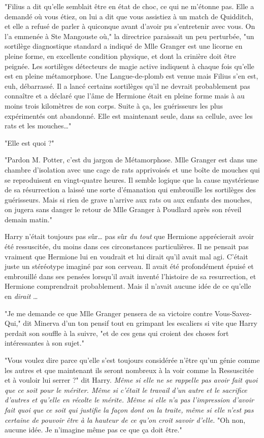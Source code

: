 "Filius a dit qu'elle semblait être en état de choc, ce qui ne m'étonne pas. Elle a demandé où vous étiez, on lui a dit que vous assistiez à un match de Quidditch, et elle a refusé de parler à quiconque avant d'avoir pu s'entretenir avec vous. On l'a emmenée à Ste Mangouste où," la directrice paraissait un peu perturbée, "un sortilège diagnostique standard a indiqué de Mlle Granger est une licorne en pleine forme, en excellente condition physique, et dont la crinière doit être peignée. Les sortilèges détecteurs de magie active indiquent à chaque fois qu'elle est en pleine métamorphose. Une Langue-de-plomb est venue mais Filius s'en est, euh, débarrassé. Il a lancé certains sortilèges qu'il ne devrait probablement pas connaître et a déclaré que l'âme de Hermione était en pleine forme mais à au moins trois kilomètres de son corps. Suite à ça, les guérisseurs les plus expérimentés ont abandonné. Elle est maintenant seule, dans sa cellule, avec les rats et les mouches…"

"Elle est quoi ?"

"Pardon M. Potter, c'est du jargon de Métamorphose. Mlle Granger est dans une chambre d'isolation avec une cage de rats apprivoisés et une boîte de mouches qui se reproduisent en vingt-quatre heures. Il semble logique que la cause mystérieuse de sa résurrection a laissé une sorte d'émanation qui embrouille les sortilèges des guérisseurs. Mais si rien de grave n'arrive aux rats ou aux enfants des mouches, on jugera sans danger le retour de Mlle Granger à Poudlard après son réveil demain matin."

Harry n'était toujours pas sûr… pas sûr \emph{du tout}  que Hermione apprécierait avoir été ressuscitée, du moins dans ces circonstances particulières. Il ne pensait pas vraiment que Hermione lui en voudrait et lui dirait qu'il avait mal agi. C'était juste un stéréotype imaginé par son cerveau. Il avait été profondément épuisé et embrouillé dans ses pensées lorsqu'il avait inventé l'histoire de sa resurrection, et Hermione comprendrait probablement. Mais il n'avait aucune idée de ce qu'elle en \emph{dirait} …

"Je me demande ce que Mlle Granger pensera de sa victoire contre Vous-Savez-Qui," dit Minerva d'un ton pensif tout en grimpant les escaliers si vite que Harry perdait son souffle à la suivre, "et de ces gens qui croient des choses fort intéressantes à son sujet."

"Vous voulez dire parce qu'elle s'est toujours considérée n'être qu'un génie comme les autres et que maintenant ils seront nombreux à la voir comme la Ressuscitée et à vouloir lui serrer ?" dit Harry. \emph{Même si elle ne se rappelle pas avoir fait quoi que ce soit pour le mériter. Même si c'était le travail d'un autre et le sacrifice d'autres et qu'elle en récolte le mérite. Même si elle n'a pas l'impression d'avoir fait quoi que ce soit qui justifie la façon dont on la traite, même si elle n'est pas certaine de pouvoir être à la hauteur de ce qu'on croit savoir d'elle.}  "Oh non, aucune idée. Je n'imagine même pas ce que ça doit être."

